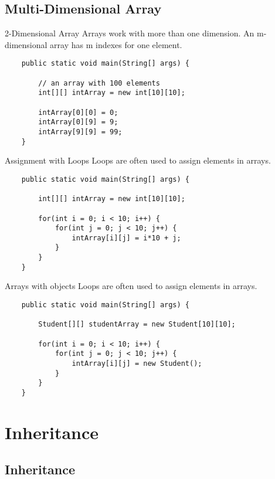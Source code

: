 \subsection{Multi-Dimensional Array}
\begin{frame}[fragile]{2-Dimensional Array}
	Arrays work with more than one dimension. 
	An m-dimensional array has m indexes for one element.
	\begin{lstlisting}
	public static void main(String[] args) {

	    // an array with 100 elements
	    int[][] intArray = new int[10][10];
	    
	    intArray[0][0] = 0;
	    intArray[0][9] = 9;
	    intArray[9][9] = 99;
	}
	\end{lstlisting}
\end{frame}

\begin{frame}[fragile]{Assignment with Loops}
	Loops are often used to assign elements in arrays.
	\begin{lstlisting}
	public static void main(String[] args) {

	    int[][] intArray = new int[10][10];
	    
	    for(int i = 0; i < 10; i++) {
	        for(int j = 0; j < 10; j++) {
	            intArray[i][j] = i*10 + j;
	        }
	    }
	}
	\end{lstlisting}
\end{frame}

\begin{frame}[fragile]{Arrays with objects}
	Loops are often used to assign elements in arrays.
	\begin{lstlisting}
	public static void main(String[] args) {

	    Student[][] studentArray = new Student[10][10];
	    
	    for(int i = 0; i < 10; i++) {
	        for(int j = 0; j < 10; j++) {
	            intArray[i][j] = new Student();
	        }
	    }
	}
	\end{lstlisting}
\end{frame}

\section{Inheritance}
\subsection{Inheritance}



